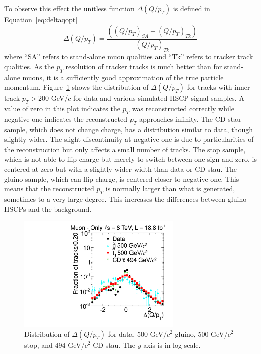 To observe this effect the unitless function
$\Delta(Q/p_T)$ is defined in Equation~\ref{eq:deltaqopt}
\begin{equation}
\Delta(Q/p_T) = \frac{((Q/p_T)_{SA} - (Q/p_T)_{Tk})}{(Q/p_T)_{Tk}}
\label{eq:deltaqopt}
\end{equation}
where ``SA'' refers to stand-alone muon qualities and ``Tk'' refers to
tracker track qualities. As the $p_T$ resolution of tracker tracks is much better than for stand-alone muons, it is a sufficiently good approximation
of the true particle momentum. Figure~\ref{fig:MuOnlyInvPtDiff} shows the distribution of
$\Delta(Q/p_T)$ for tracks with inner track $p_T > 200$ GeV/$c$
for data and various simulated HSCP signal samples.
A value of zero in this plot indicates the $p_T$ was reconstructed correctly
while negative one indicates the reconstructed $p_T$ approaches infinity.
The CD stau sample, which does not change charge,
has a distribution similar to data, though slightly wider.
The slight discontinuity at negative one is due to particularities of the reconstruction but only affects a small number of tracks.
The stop sample, which is not able to flip charge but merely to switch
between one sign and zero, is centered at zero but with a slightly wider
width than data or CD stau.
The gluino sample, which can flip charge, is centered closer to negative one.
This means that
the reconstructed $p_T$ is normally larger than what is generated, sometimes
to a very large degree. This increases the differences between gluino HSCPs and the background.

\begin{figure}
 \begin{center}
  \includegraphics[width=0.7\textwidth]{figures/muonly/Selection_Comp_Signal_8TeV_InnerInvPtDiff_BS}
 \end{center}
 \caption{Distribution of $\Delta(Q/p_T)$
    for data, 500 GeV/$c^2$ gluino, 500 GeV/$c^2$ stop, and 494 GeV/$c^2$ CD stau. The $y$-axis is in log scale.
    \label{fig:MuOnlyInvPtDiff}}
\end{figure}

